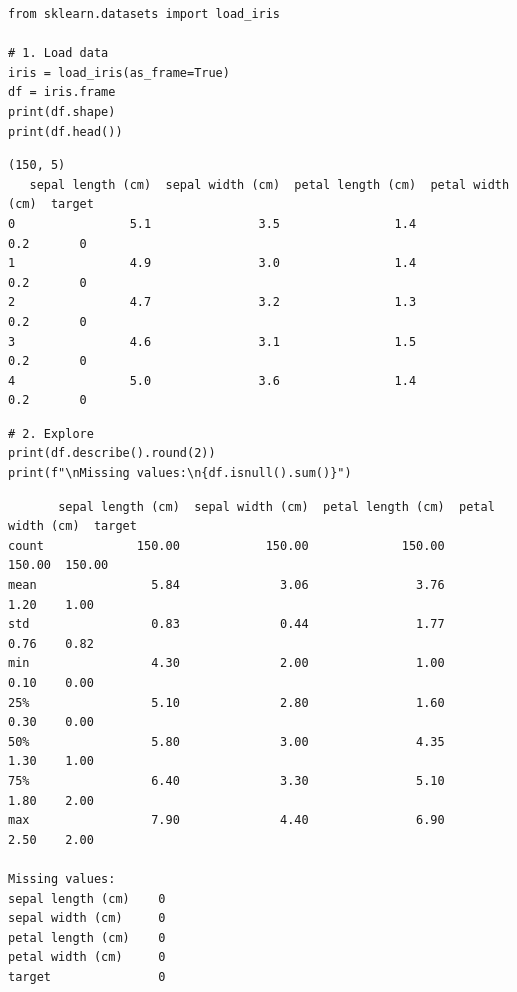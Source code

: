 \begin{codeblock}[title=\textbf{Python --- Load and explore Iris}]
\begin{verbatim}
from sklearn.datasets import load_iris

# 1. Load data
iris = load_iris(as_frame=True)
df = iris.frame
print(df.shape)
print(df.head())
\end{verbatim}
\end{codeblock}

\begin{codeoutput}
\begin{verbatim}
(150, 5)
   sepal length (cm)  sepal width (cm)  petal length (cm)  petal width (cm)  target
0                5.1               3.5                1.4               0.2       0
1                4.9               3.0                1.4               0.2       0
2                4.7               3.2                1.3               0.2       0
3                4.6               3.1                1.5               0.2       0
4                5.0               3.6                1.4               0.2       0
\end{verbatim}
\end{codeoutput}

\begin{codeblock}[title=\textbf{Python --- Descriptive statistics}]
\begin{verbatim}
# 2. Explore
print(df.describe().round(2))
print(f"\nMissing values:\n{df.isnull().sum()}")
\end{verbatim}
\end{codeblock}

\begin{codeoutput}
\begin{verbatim}
       sepal length (cm)  sepal width (cm)  petal length (cm)  petal width (cm)  target
count             150.00            150.00             150.00            150.00  150.00
mean                5.84              3.06               3.76              1.20    1.00
std                 0.83              0.44               1.77              0.76    0.82
min                 4.30              2.00               1.00              0.10    0.00
25%                 5.10              2.80               1.60              0.30    0.00
50%                 5.80              3.00               4.35              1.30    1.00
75%                 6.40              3.30               5.10              1.80    2.00
max                 7.90              4.40               6.90              2.50    2.00

Missing values:
sepal length (cm)    0
sepal width (cm)     0
petal length (cm)    0
petal width (cm)     0
target               0
\end{verbatim}
\end{codeoutput}

